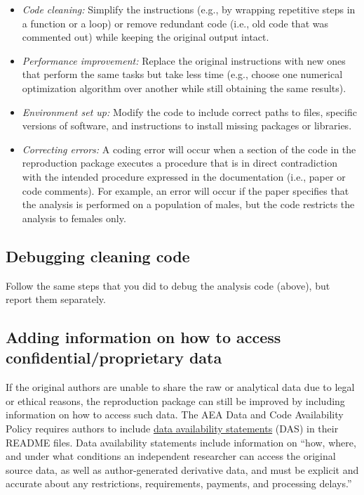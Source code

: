 \documentclass[
]{book}
\providecommand{\tightlist}{%
  \setlength{\itemsep}{0pt}\setlength{\parskip}{0pt}}
\begin{document}
\begin{itemize}
\tightlist
\item
  \emph{Code cleaning:} Simplify the instructions (e.g., by wrapping repetitive steps in a function or a loop) or remove redundant code (i.e., old code that was commented out) while keeping the original output intact.\\
\item
  \emph{Performance improvement:} Replace the original instructions with new ones that perform the same tasks but take less time (e.g., choose one numerical optimization algorithm over another while still obtaining the same results).\\
\item
  \emph{Environment set up:} Modify the code to include correct paths to files, specific versions of software, and instructions to install missing packages or libraries.\\
\item
  \emph{Correcting errors:} A coding error will occur when a section of the code in the reproduction package executes a procedure that is in direct contradiction with the intended procedure expressed in the documentation (i.e., paper or code comments). For example, an error will occur if the paper specifies that the analysis is performed on a population of males, but the code restricts the analysis to females only.
\end{itemize}

\hypertarget{debugging-cleaning-code}{%
\subsection{Debugging cleaning code}\label{debugging-cleaning-code}}

Follow the same steps that you did to debug the analysis code (above), but report them separately.

\hypertarget{adding-information-on-how-to-access-confidentialproprietary-data}{%
\subsection{Adding information on how to access confidential/proprietary data}\label{adding-information-on-how-to-access-confidentialproprietary-data}}

If the original authors are unable to share the raw or analytical data due to legal or ethical reasons, the reproduction package can still be improved by including information on how to access such data. The AEA Data and Code Availability Policy requires authors to include \href{https://www.aeaweb.org/journals/data/data-code-policy\#statement}{data availability statements} (DAS) in their README files. Data availability statements include information on ``how, where, and under what conditions an independent researcher can access the original source data, as well as author-generated derivative data, and must be explicit and accurate about any restrictions, requirements, payments, and processing delays.''
\end{document}
